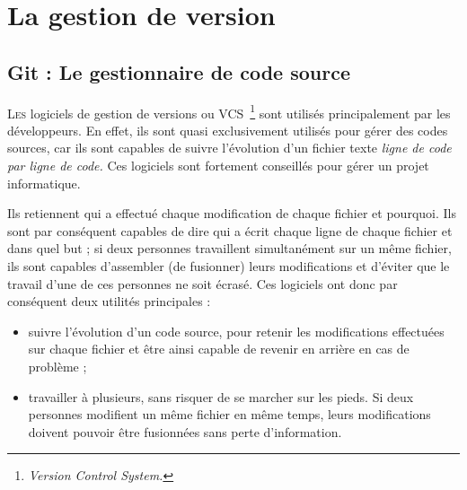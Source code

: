 \chapter{La gestion de version} %
\label{cha:La gestion de version}

\section{Git : Le gestionnaire de code source} %
\label{sec:Git : Le gestionnaire de code source}

\lettrine{L}{es} logiciels de gestion de versions ou VCS\,
\footnote{\emph{Version Control System.}} sont utilisés principalement
par les développeurs. En effet, ils sont quasi exclusivement utilisés
pour gérer des codes sources, car ils sont capables de suivre
l’évolution d’un fichier texte \emph{ligne de code par ligne de code.}
Ces logiciels sont fortement conseillés pour gérer un projet
informatique.

Ils retiennent qui a effectué chaque modification de chaque fichier et
pourquoi. Ils sont par conséquent capables de dire qui a écrit chaque
ligne de chaque fichier et dans quel but ; si deux personnes travaillent
simultanément sur un même fichier, ils sont capables d’assembler (de
fusionner) leurs modifications et d’éviter que le travail d’une de ces
personnes ne soit écrasé.  Ces logiciels ont donc par conséquent deux
utilités principales :

\begin{itemize}
    \item suivre l’évolution d’un code source, pour retenir les
    modifications effectuées sur chaque fichier et être ainsi capable de
    revenir en arrière en cas de problème ;

    \item travailler à plusieurs, sans risquer de se marcher sur les
    pieds.  Si deux personnes modifient un même fichier en même temps, leurs
    modifications doivent pouvoir être fusionnées sans perte d’information.
\end{itemize}


